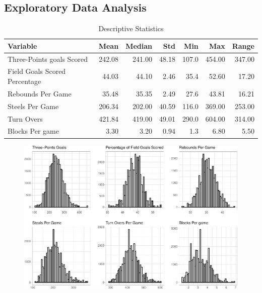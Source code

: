 \documentclass[
  man,floatsintext]{apa6}
\begin{document}
\hypertarget{exploratory-data-analysis}{%
\subsection{Exploratory Data Analysis}\label{exploratory-data-analysis}}

\begin{longtable}[t]{lrrrrrr}
\caption{\label{tab:unnamed-chunk-1}Descriptive Statistics}\\
\toprule
Variable & Mean & Median & Std & Min & Max & Range\\
\midrule
Three-Points goals Scored & 242.08 & 241.00 & 48.18 & 107.0 & 454.00 & 347.00\\
Field Goals Scored Percentage & 44.03 & 44.10 & 2.46 & 35.4 & 52.60 & 17.20\\
Rebounds Per Game & 35.48 & 35.35 & 2.49 & 27.6 & 43.81 & 16.21\\
Steels Per Game & 206.34 & 202.00 & 40.59 & 116.0 & 369.00 & 253.00\\
Turn Overs & 421.84 & 419.00 & 49.01 & 290.0 & 604.00 & 314.00\\
\addlinespace
Blocks Per game & 3.30 & 3.20 & 0.94 & 1.3 & 6.80 & 5.50\\
\bottomrule
\end{longtable}

\begin{figure}

{\centering \includegraphics{paper_files/figure-latex/unnamed-chunk-2-1} 

}

\caption{ }\label{fig:unnamed-chunk-2}
\end{figure}
\end{document}
